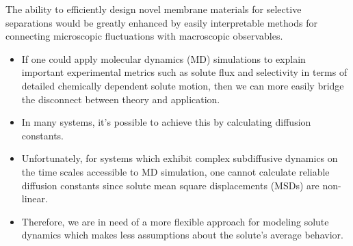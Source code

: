 \documentclass[journal=jpcbfk,manuscript=article]{achemso}
\begin{document}
  The ability to efficiently design novel membrane materials for selective separations
  would be greatly enhanced by easily interpretable methods for connecting microscopic
  fluctuations with macroscopic observables.
  \begin{itemize}
  	\item If one could apply molecular dynamics (MD) simulations to explain important
  	experimental metrics such as solute flux and selectivity in terms of detailed 
  	chemically dependent solute motion, then we can more easily bridge the disconnect
  	between theory and application.
  	\item In many systems, it's possible to achieve this by calculating diffusion 
  	constants.\cite{}
  	\item Unfortunately, for systems which exhibit complex subdiffusive dynamics on the
  	time scales accessible to MD simulation, one cannot calculate reliable diffusion 
  	constants since solute mean square displacements (MSDs) are non-linear.
  	\item Therefore, we are in need of a more flexible approach for modeling solute 
  	dynamics which makes less assumptions about the solute's average behavior.
  \end{itemize}
  
\end{document}
